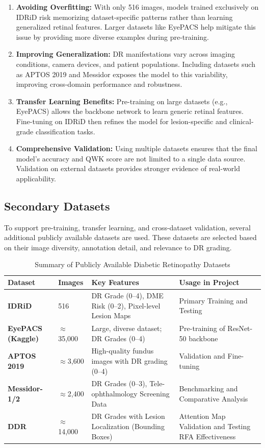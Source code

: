 \documentclass[12pt,a4paper]{article}
\begin{document}
\begin{enumerate}
    \item \textbf{Avoiding Overfitting:} With only 516 images, models trained exclusively on IDRiD risk memorizing dataset-specific patterns rather than learning generalized retinal features. Larger datasets like EyePACS help mitigate this issue by providing more diverse examples during pre-training.
    \item \textbf{Improving Generalization:} DR manifestations vary across imaging conditions, camera devices, and patient populations. Including datasets such as APTOS 2019 and Messidor exposes the model to this variability, improving cross-domain performance and robustness.
    \item \textbf{Transfer Learning Benefits:} Pre-training on large datasets (e.g., EyePACS) allows the backbone network to learn generic retinal features. Fine-tuning on IDRiD then refines the model for lesion-specific and clinical-grade classification tasks.
    \item \textbf{Comprehensive Validation:} Using multiple datasets ensures that the final model’s accuracy and QWK score are not limited to a single data source. Validation on external datasets provides stronger evidence of real-world applicability.
\end{enumerate}

\subsection{Secondary Datasets}
To support pre-training, transfer learning, and cross-dataset validation, several additional publicly available datasets are used. These datasets are selected based on their image diversity, annotation detail, and relevance to DR grading.

\begin{table}[H]
\centering
\caption{Summary of Publicly Available Diabetic Retinopathy Datasets}
\small
\begin{tabular}{@{}lp{2cm}p{5.2cm}p{4.2cm}@{}}
\toprule
\textbf{Dataset} & \textbf{Images} & \textbf{Key Features} & \textbf{Usage in Project} \\ \midrule
\textbf{IDRiD} & 516 & DR Grade (0–4), DME Risk (0–2), Pixel-level Lesion Maps & Primary Training and Testing \\
\textbf{EyePACS (Kaggle)} & $\approx$35,000 & Large, diverse dataset; DR Grades (0–4) & Pre-training of ResNet-50 backbone \\
\textbf{APTOS 2019} & $\approx$3,600 & High-quality fundus images with DR grading (0–4) & Validation and Fine-tuning \\
\textbf{Messidor-1/2} & $\approx$2,400 & DR Grades (0–3), Tele-ophthalmology Screening Data & Benchmarking and Comparative Analysis \\
\textbf{DDR} & $\approx$14,000 & DR Grades with Lesion Localization (Bounding Boxes) & Attention Map Validation and Testing RFA Effectiveness \\ \bottomrule
\end{tabular}
\end{table}
\end{document}
